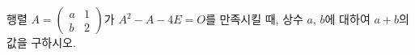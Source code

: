 \hspace*{2mm}\begin{minipage}[t]{\dimexpr\linewidth-2mm\relax}\vspace{0pt}
행렬 $A=\begin{pmatrix} a & 1 \\ b & 2 \end{pmatrix}$가 $A^2-A-4E=O$를 만족시킬 때, 상수 $a$, $b$에 대하여 $a+b$의 값을 구하시오. \end{minipage}
